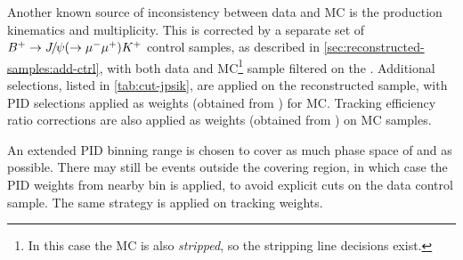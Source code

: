 Another known source of inconsistency between data and MC is the \B production
kinematics and multiplicity.
This is corrected by a separate set of
${{{B}^+}} \rightarrow {\ensuremath{{J\mskip -3mu/\mskip -2mu\psi}}} (\rightarrow {\ensuremath{\mu^-}}{\ensuremath{\mu^+}}) {{K}^+}$
control samples, as described
in \cref{sec:reconstructed-samples:add-ctrl}, with both data and MC\footnote{
    In this case the MC is also \emph{stripped}, so the stripping line
    decisions exist.
}
sample filtered on the .
Additional selections,
listed in \cref{tab:cut-jpsik},
are applied on the reconstructed sample, with PID
selections applied as weights (obtained from \pidcalib) for MC.
Tracking efficiency ratio corrections are also applied as weights
(obtained from \trackcalib) on MC samples.

An extended PID binning range is chosen to cover as much phase space of
\kaon and \muon as possible.
There may still be events outside the covering region, in which case the PID
weights from nearby bin is applied,
to avoid explicit cuts on the \jpsi\kaon data control sample.
The same strategy is applied on tracking weights.

